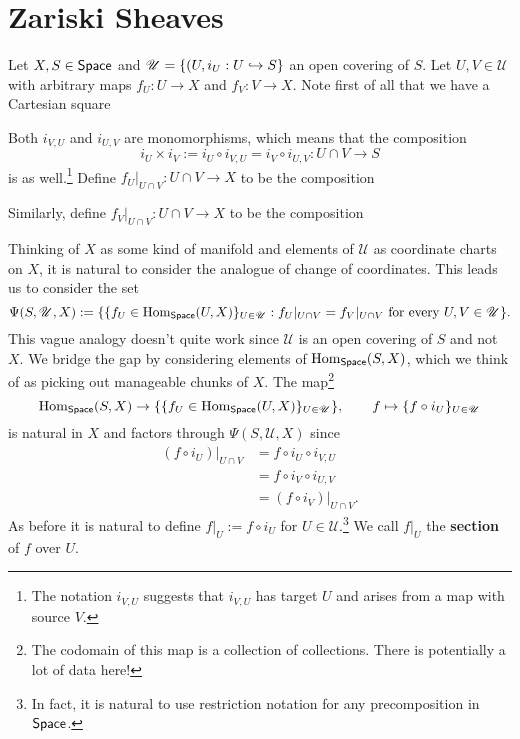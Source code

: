 \documentclass[11pt]{article}
\newcommand{\U}{\mathscr{U}}
\begin{document}
\section{Zariski Sheaves}
Let $X,S\in\operatorname{\mathsf{Space}}$ and $\U=\{(U,i_U: U\inj S\}$ an open covering of $S$. Let $U,V\in\U$ with arbitrary maps $f_U: U\to X$ and $f_V: V\to X$. Note first of all that we have a Cartesian square
\begin{center}
\end{center}
Both $i_{V,U}$ and $i_{U,V}$ are monomorphisms, which means that the composition 
$$i_U\times i_V:=i_U\circ i_{V,U}=i_V\circ i_{U,V}: U\cap V\to S$$
is as well.\footnote{The notation $i_{V,U}$ suggests that $i_{V,U}$ has target $U$ and arises from a map with source $V$.} Define $f_U|_{U\cap V}: U\cap V\to X$ to be the composition
\begin{center}
\end{center}
Similarly, define $f_V|_{U\cap V}: U\cap V\to X$ to be the composition
\begin{center}
\end{center}
Thinking of $X$ as some kind of manifold and elements of $\U$ as coordinate charts on $X$, it is natural to consider the analogue of change of coordinates. This leads us to consider the set 
$$\Psi(S,\U,X):=\{\{f_U\in\Hom_{\Space}(U,X)\}_{U\in\U} : f_U|_{U\cap V}=f_V|_{U\cap V}\textrm{ for every }U,V\in\U\}.$$
This vague analogy doesn't quite work since $\U$ is an open covering of $S$ and not $X$. We bridge the gap by considering elements of $\operatorname{Hom}_{\operatorname{\mathsf{Space}}}(S,X)$, which we think of as picking out manageable chunks of $X$. The map\footnote{The codomain of this map is a collection of collections. There is potentially a lot of data here!}
$$\Hom_{\Space}(S,X)\to\{\{f_U\in\Hom_{\Space}(U,X)\}_{U\in\U}\},\qquad f\mapsto\{f\circ i_U\}_{U\in\U}$$
is natural in $X$ and factors through $\Psi(S,\U,X)$ since
\begin{align*}
(f\circ i_U)|_{U\cap V}
&=f\circ i_U\circ i_{V,U} \\
&=f\circ i_V\circ i_{U,V} \\
&=(f\circ i_V)|_{U\cap V}.
\end{align*}
As before it is natural to define $f|_U:=f\circ i_U$ for $U\in\U$.\footnote{In fact, it is natural to use restriction notation for any precomposition in $\operatorname{\mathsf{Space}}$.} We call $f|_U$ the \textbf{section} of $f$ over $U$.
\end{document}
